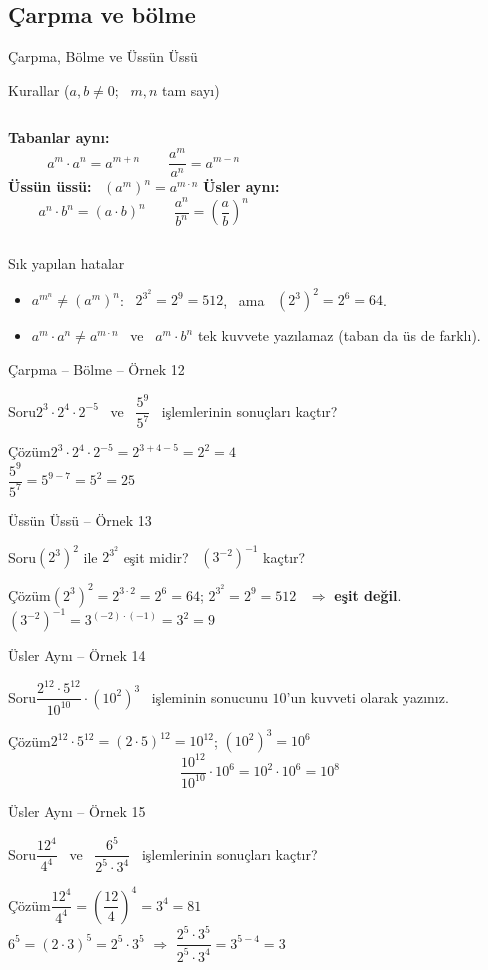 \documentclass[aspectratio=169,11pt,handout]{beamer}
\newcommand{\soru}[3]{%
\begin{frame}{#1}
  \begin{block}{Soru}\large #2\end{block}
  \pause
  \begin{exampleblock}{Çözüm}\large #3\end{exampleblock}
\end{frame}}
\begin{document}
\subsection{Çarpma ve bölme}
\begin{frame}{Çarpma, Bölme ve Üssün Üssü}
\begin{block}{Kurallar (\(a,b\neq 0\); \ \(m,n\) tam sayı)}
\begin{columns}[t]
\textbf{Tabanlar aynı:}
\[a^m\cdot a^n=a^{m+n}\qquad \frac{a^m}{a^n}=a^{m-n}\]
\textbf{Üssün üssü:} \ \((a^m)^n=a^{m\cdot n}\)
\textbf{Üsler aynı:}
\[a^n\cdot b^n=(a\cdot b)^n\qquad \frac{a^n}{b^n}=\left(\frac{a}{b}\right)^n\]
\end{columns}
\end{block}
\begin{alertblock}{Sık yapılan hatalar}
\begin{itemize}
\item \(a^{m^n}\neq(a^m)^n\): \ \(2^{3^2}=2^{9}=512\), \ ama \ \((2^3)^2=2^6=64\).
\item \(a^m\cdot a^n\neq a^{m\cdot n}\) \ ve \ \(a^m\cdot b^n\) tek kuvvete yazılamaz (taban da üs de farklı).
\end{itemize}
\end{alertblock}
\end{frame}

\soru{Çarpma -- Bölme -- Örnek 12}
{\(2^3\cdot 2^4\cdot 2^{-5}\) \ ve \ \(\dfrac{5^9}{5^7}\) \ işlemlerinin sonuçları kaçtır?}
{\(2^3\cdot 2^4\cdot 2^{-5}=2^{3+4-5}=2^2=4\)\\[4pt]
\(\dfrac{5^9}{5^7}=5^{9-7}=5^2=25\)}

\soru{Üssün Üssü -- Örnek 13}
{\((2^3)^2\) ile \(2^{3^2}\) eşit midir? \ \((3^{-2})^{-1}\) kaçtır?}
{\((2^3)^2=2^{3\cdot 2}=2^6=64\); \qquad \(2^{3^2}=2^{9}=512\) \ \(\Rightarrow\) \textbf{eşit değil}.\\[4pt]
\((3^{-2})^{-1}=3^{(-2)\cdot(-1)}=3^2=9\)}

\soru{Üsler Aynı -- Örnek 14}
{\(\dfrac{2^{12}\cdot 5^{12}}{10^{10}}\cdot (10^2)^3\) \ işleminin sonucunu \(10\)'un kuvveti olarak yazınız.}
{\(2^{12}\cdot 5^{12}=(2\cdot 5)^{12}=10^{12}\); \qquad \((10^2)^3=10^6\)
\[\frac{10^{12}}{10^{10}}\cdot 10^6=10^{2}\cdot 10^{6}=10^{8}\]}

\soru{Üsler Aynı -- Örnek 15}
{\(\dfrac{12^4}{4^4}\) \ ve \ \(\dfrac{6^5}{2^5\cdot 3^4}\) \ işlemlerinin sonuçları kaçtır?}
{\(\dfrac{12^4}{4^4}=\left(\dfrac{12}{4}\right)^4=3^4=81\)\\[4pt]
\(6^5=(2\cdot 3)^5=2^5\cdot 3^5\) \(\Rightarrow\) \(\dfrac{2^5\cdot 3^5}{2^5\cdot 3^4}=3^{5-4}=3\)}
\end{document}
